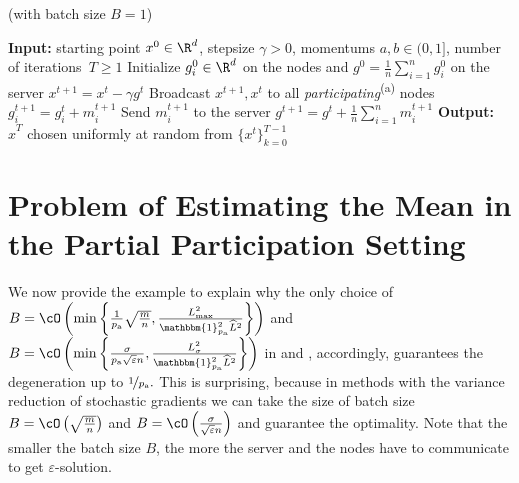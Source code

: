 \documentclass{article}
\newcommand{\algorithmname}{DASHA-PP}
\newcommand*{\probavailable}{\ensuremath{p_{\textnormal{a}}}}
\begin{document}
\begin{algorithm*}
  \caption{ (with batch size $B = 1$)}
  \label{alg:main_algorithm_dasha_mvr}
  \begin{algorithmic}[1]
  \STATE \textbf{Input:} starting point $x^0 \in \R^d$, stepsize $\gamma > 0$, momentums $a, b \in (0, 1]$, 
  number of iterations~$T \geq 1$
  \STATE Initialize $g^0_i\in \R^d$ on the nodes and  $g^0 = \frac{1}{n}\sum_{i=1}^n g^0_i$ on the server
  \STATE $x^{t+1} = x^t - \gamma g^t$
  \STATE Broadcast $x^{t+1}, x^{t}$ to all \textit{participating}\textsuperscript{\red (a)} nodes
  \STATE $g^{t+1}_i = g^{t}_i + m^{t+1}_i$
  \STATE Send $m^{t+1}_i$ to the server
  \ENDFOR
  \STATE $g^{t+1} = g^t + \frac{1}{n} \sum_{i=1}^n m^{t+1}_i$
  \ENDFOR
  \STATE \textbf{Output:} $\hat{x}^T$ chosen uniformly at random from $\{x^t\}_{k=0}^{T-1}$ 
  \end{algorithmic}
\end{algorithm*}

\newpage

\section{Problem of Estimating the Mean in the Partial Participation Setting}
\label{sec:partial_participation_sampling}
We now provide the example to explain why the only choice of $B = \cO\left(\min\left\{\frac{1}{\probavailable}\sqrt{\frac{m}{n}},\frac{L_{\max}^2}{\mathbbm{1}_{\probavailable}^2 \widehat{L}^2}\right\}\right)$ and $B = \cO\left(\min\left\{\frac{\sigma}{\probavailable \sqrt{\varepsilon} n}, \frac{L_{\sigma}^2}{\mathbbm{1}_{\probavailable}^2 \widehat{L}^2}\right\}\right)$ in \algname{\algorithmname-PAGE} and \algname{\algorithmname-MVR}, accordingly, guarantees the degeneration up to $\nicefrac{1}{\probavailable}.$ This is surprising, because in methods with the variance reduction of stochastic gradients \citep{PAGE, tyurin2022dasha} we can take the size of batch size $B = \cO\left(\sqrt{\frac{m}{n}}\right)$ and $B = \cO\left(\frac{\sigma}{\sqrt{\varepsilon} n}\right)$ and guarantee the optimality. Note that the smaller the batch size $B$, the more the server and the nodes have to communicate to get $\varepsilon$-solution.
\end{document}
